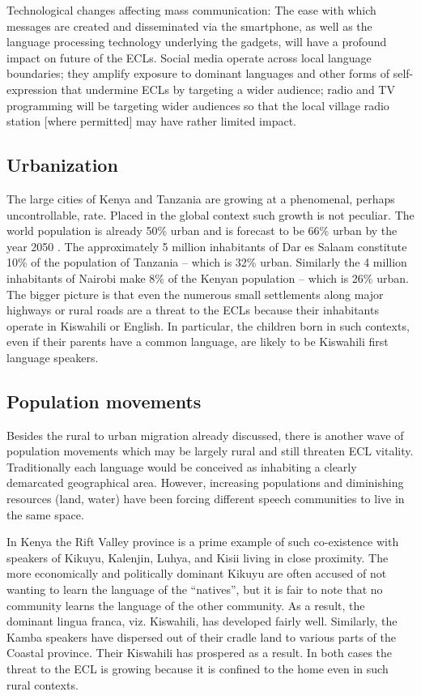 \documentclass[output=paper,colorlinks,citecolor=brown]{langscibook}
\begin{document}
Technological changes affecting mass communication: The ease with which messages are created and disseminated via the smartphone, as well as the language processing technology underlying the gadgets, will have a profound impact on future of the ECLs. Social media operate across local language boundaries; they amplify exposure to dominant languages and other forms of self-expression that undermine ECLs by targeting a wider audience; radio and TV programming will be targeting wider  audiences so that the local village radio station [where permitted] may have rather limited impact.

\subsection{Urbanization} 
The large cities of Kenya and Tanzania are growing at a phenomenal, perhaps uncontrollable, rate. Placed in the global context such growth is not peculiar. The world population is already 50\% urban and is forecast to be 66\% urban by the year 2050 \citep{URBANET2019}. The approximately 5 million inhabitants of Dar es Salaam constitute 10\% of the population of Tanzania -- which is 32\% urban. Similarly the 4 million inhabitants of Nairobi make 8\% of the Kenyan population – which is 26\% urban. The bigger picture is that even the numerous small settlements along major highways or rural roads are a threat to the ECLs because their inhabitants operate in Kiswahili or English. In particular, the children born in such contexts, even if their parents have a common language, are likely to be Kiswahili first language speakers. 

\subsection{Population movements}
Besides the rural to urban migration already discussed, there is another wave of population movements which may be largely rural and still threaten ECL vitality. Traditionally each language would be conceived as inhabiting a clearly demarcated geographical area. However, increasing populations and diminishing resources (land, water) have been forcing different speech communities to live in the same space. 

In Kenya the Rift Valley province is a prime example of such co-existence with speakers of Kikuyu, Kalenjin, Luhya, and Kisii living in close proximity.  The more economically and politically dominant Kikuyu are often accused of not wanting to learn the language of the “natives”, but it is fair to note that no community learns the language of the other community. As a result, the dominant lingua franca, viz. Kiswahili, has developed fairly well. Similarly, the Kamba speakers have dispersed out of their cradle land to various parts of the Coastal province. Their Kiswahili has prospered as a result. In both cases the threat to the ECL is growing because it is confined to the home even in such rural contexts. 
\end{document}
